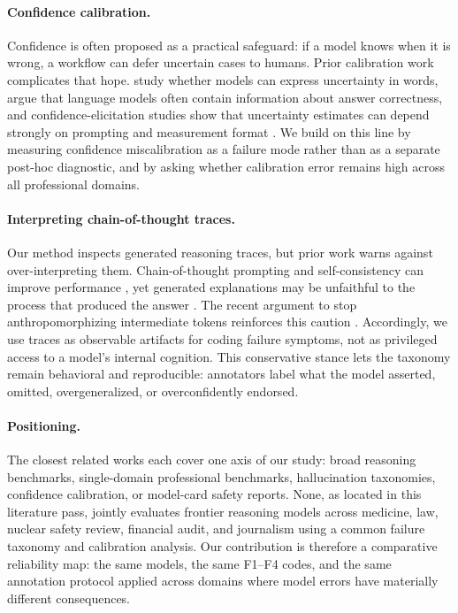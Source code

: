\paragraph{Confidence calibration.}
Confidence is often proposed as a practical safeguard: if a model knows when it is wrong, a workflow can defer uncertain cases to humans. Prior calibration work complicates that hope. \citet{lin2022calibration} study whether models can express uncertainty in words, \citet{kadavath2022language} argue that language models often contain information about answer correctness, and confidence-elicitation studies show that uncertainty estimates can depend strongly on prompting and measurement format \citep{xiong2023calibration}. We build on this line by measuring confidence miscalibration as a failure mode rather than as a separate post-hoc diagnostic, and by asking whether calibration error remains high across all professional domains.

\paragraph{Interpreting chain-of-thought traces.}
Our method inspects generated reasoning traces, but prior work warns against over-interpreting them. Chain-of-thought prompting and self-consistency can improve performance \citep{wei2022cot,wang2023selfconsistency}, yet generated explanations may be unfaithful to the process that produced the answer \citep{turpin2023unfaithful}. The recent argument to stop anthropomorphizing intermediate tokens reinforces this caution \citep{stopanthro2024}. Accordingly, we use traces as observable artifacts for coding failure symptoms, not as privileged access to a model's internal cognition. This conservative stance lets the taxonomy remain behavioral and reproducible: annotators label what the model asserted, omitted, overgeneralized, or overconfidently endorsed.

\paragraph{Positioning.}
The closest related works each cover one axis of our study: broad reasoning benchmarks, single-domain professional benchmarks, hallucination taxonomies, confidence calibration, or model-card safety reports. None, as located in this literature pass, jointly evaluates frontier reasoning models across medicine, law, nuclear safety review, financial audit, and journalism using a common failure taxonomy and calibration analysis. Our contribution is therefore a comparative reliability map: the same models, the same F1--F4 codes, and the same annotation protocol applied across domains where model errors have materially different consequences.
